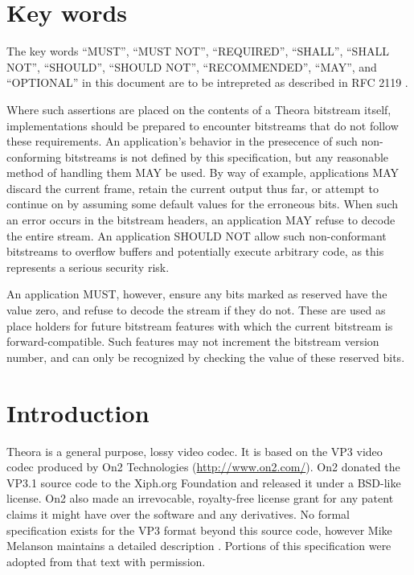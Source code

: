 \documentclass[9pt,letterpaper]{book}
\numberwithin{equation}{chapter}
\numberwithin{figure}{chapter}
\numberwithin{table}{chapter}
\begin{document}
\thispagestyle{plain}
\chapter*{Key words}

\setlength{\emergencystretch}{2em}
The key words ``MUST'', ``MUST NOT'', ``REQUIRED'', ``SHALL'', ``SHALL NOT'',
 ``SHOULD'', ``SHOULD NOT'', ``RECOMMENDED'', ``MAY'', and ``OPTIONAL'' in this
 document are to be intrepreted as described in RFC 2119 \cite{rfc2119}.\par
\setlength{\emergencystretch}{0em}

Where such assertions are placed on the contents of a Theora bitstream itself,
 implementations should be prepared to encounter bitstreams that do not follow
 these requirements.
An application's behavior in the presecence of such non-conforming bitstreams
 is not defined by this specification, but any reasonable method of handling 
 them MAY be used.
By way of example, applications MAY discard the current frame, retain the
 current output thus far, or attempt to continue on by assuming some default
 values for the erroneous bits.
When such an error occurs in the bitstream headers, an application MAY refuse
 to decode the entire stream.
An application SHOULD NOT allow such non-conformant bitstreams to overflow
 buffers and potentially execute arbitrary code, as this represents a serious
 security risk.

An application MUST, however, ensure any bits marked as reserved have the value
 zero, and refuse to decode the stream if they do not.
These are used as place holders for future bitstream features with which the
 current bitstream is forward-compatible.
Such features may not increment the bitstream version number, and can only be
 recognized by checking the value of these reserved bits.

\cleardoublepage



\mainmatter

\setcounter{page}{1}

\chapter{Introduction}

Theora is a general purpose, lossy video codec.
It is based on the VP3 video codec produced by On2 Technologies
 (\url{http://www.on2.com/}).
On2 donated the VP3.1 source code to the Xiph.org Foundation and released it
 under a BSD-like license.
On2 also made an irrevocable, royalty-free license grant for any patent claims
 it might have over the software and any derivatives.
No formal specification exists for the VP3 format beyond this source code,
 however Mike Melanson maintains a detailed description \cite{Mel04}.
Portions of this specification were adopted from that text with permission.
\end{document}
